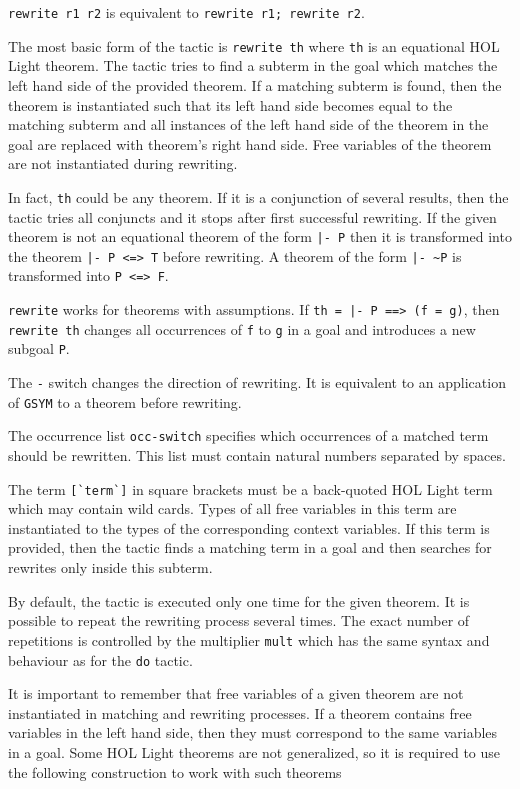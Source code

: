\documentclass[a4paper]{article}
\begin{document}
\verb|rewrite r1 r2| is equivalent to \verb|rewrite r1; rewrite r2|.

The most basic form of the tactic is \verb|rewrite th| where \verb|th| is an equational HOL Light theorem. The tactic tries to find a subterm in the goal which matches the left hand side of the provided theorem. If a matching subterm is found, then the theorem is instantiated such that its left hand side becomes equal to the matching subterm and all instances of the left hand side of the theorem in the goal are replaced with theorem's right hand side. Free variables of the theorem are not instantiated during rewriting.

In fact, \verb|th| could be any theorem. If it is a conjunction of several results, then the tactic tries all conjuncts and it stops after first successful rewriting. If the given theorem is not an equational theorem of the form \verb$|- P$ then it is transformed into the theorem \verb$|- P <=> T$ before rewriting. A theorem of the form \verb$|- ~P$ is transformed into \verb$P <=> F$.

\verb|rewrite| works for theorems with assumptions. If \verb$th = |- P ==> (f = g)$, then \verb|rewrite th| changes all occurrences of \verb|f| to \verb|g| in a goal and introduces a new subgoal \verb|P|.

The \verb|-| switch changes the direction of rewriting. It is equivalent to an application of \verb|GSYM| to a theorem before rewriting.

The occurrence list \verb|occ-switch| specifies which occurrences of a matched term should be rewritten. This list must contain natural numbers separated by spaces.

The term \verb|[`term`]| in square brackets must be a back-quoted HOL Light term which may contain wild cards. Types of all free variables in this term are instantiated to the types of the corresponding context variables. If this term is provided, then the tactic finds a matching term in a goal and then searches for rewrites only inside this subterm.

By default, the tactic is executed only one time for the given theorem. It is possible to repeat the rewriting process several times. The exact number of repetitions is controlled by the multiplier \verb|mult| which has the same syntax and behaviour as for the \verb|do| tactic.

It is important to remember that free variables of a given theorem are not instantiated in matching and rewriting processes. If a theorem contains free variables in the left hand side, then they must correspond to the same variables in a goal. Some HOL Light theorems are not generalized, so it is required to use the following construction to work with such theorems
\end{document}
